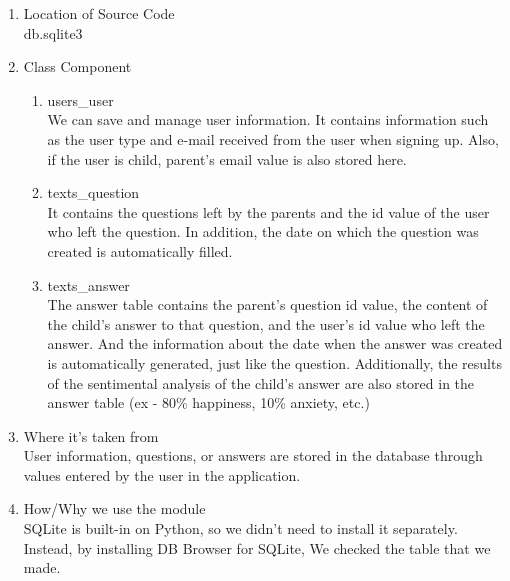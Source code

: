 \documentclass[conference]{IEEEtran}
\begin{document}
\begin{enumerate}
\begin{enumerate}
            \item Location of Source Code
            \\db.sqlite3
            
            \item Class Component
            \begin{enumerate}
                \item users\_user
                \\We can save and manage user information. It contains information such as the user type and e-mail received from the user when signing up. Also, if the user is child, parent's email value is also stored here.
                
                \item texts\_question
                \\It contains the questions left by the parents and the id value of the user who left the question. In addition, the date on which the question was created is automatically filled.
                
                \item texts\_answer
                \\The answer table contains the parent's question id value, the content of the child's answer to that question, and the user's id value who left the answer. And the information about the date when the answer was created is automatically generated, just like the question. Additionally, the results of the sentimental analysis of the child's answer are also stored in the answer table (ex - 80\% happiness, 10\% anxiety, etc.)       
            \end{enumerate}

            \item Where it’s taken from
            \\User information, questions, or answers are stored in the database through values entered by the user in the application.
            
            \item How/Why we use the module
            \\SQLite is built-in on Python, so we didn’t need to install it separately. Instead, by installing DB Browser for SQLite, We checked the table that we made.
            
        \end{enumerate}
        

\end{enumerate}
\end{document}
